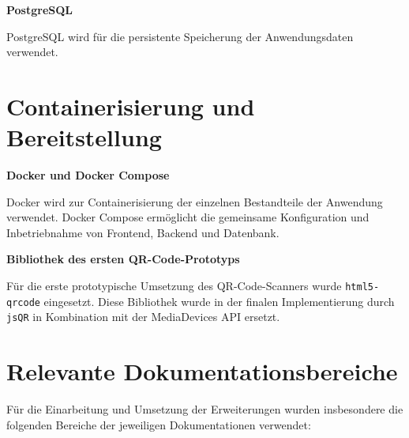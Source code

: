 ﻿\documentclass[oneside]{ausarbeitung}
\begin{document}
\textbf{PostgreSQL}

PostgreSQL wird für die persistente Speicherung der Anwendungsdaten verwendet.


\section{Containerisierung und Bereitstellung}

\textbf{Docker und Docker Compose}

Docker wird zur Containerisierung der einzelnen Bestandteile der Anwendung verwendet. Docker Compose ermöglicht die gemeinsame Konfiguration 
und Inbetriebnahme von Frontend, Backend und Datenbank.


\textbf{Bibliothek des ersten QR-Code-Prototyps}

Für die erste prototypische Umsetzung des QR-Code-Scanners wurde \texttt{html5-qrcode} eingesetzt. Diese Bibliothek wurde in der finalen
Implementierung durch \texttt{jsQR} in Kombination mit der MediaDevices API ersetzt.



\section{Relevante Dokumentationsbereiche}
\label{sec:relevante-dokumentationen}

Für die Einarbeitung und Umsetzung der Erweiterungen wurden insbesondere die folgenden Bereiche der jeweiligen Dokumentationen verwendet:
\end{document}
